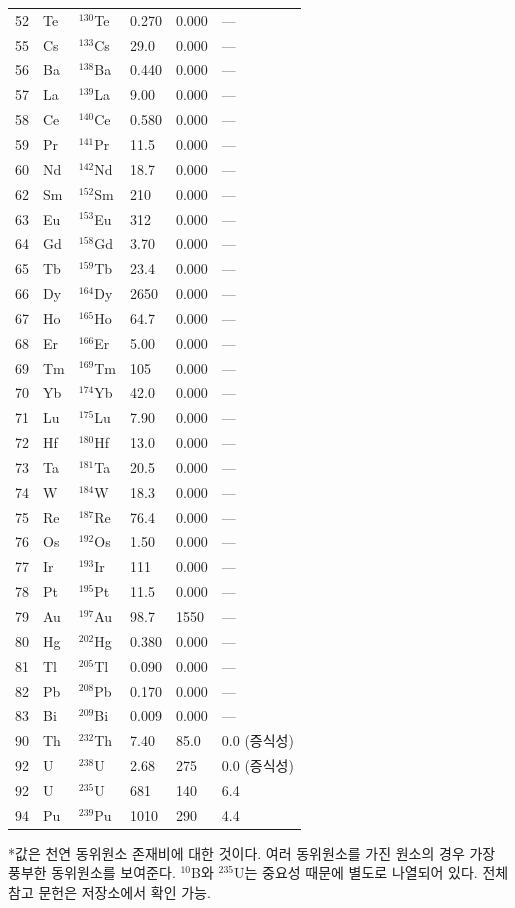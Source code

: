 \documentclass[12pt,a4paper]{article}
\begin{document}
\begin{longtable}{p{0.8cm}p{1.2cm}p{2.0cm}p{2.5cm}p{2.5cm}p{2.5cm}}
		52 & Te & \(^{130}\)Te & 0.270 & 0.000 & --- \\
		55 & Cs & \(^{133}\)Cs & 29.0 & 0.000 & --- \\
		56 & Ba & \(^{138}\)Ba & 0.440 & 0.000 & --- \\
		57 & La & \(^{139}\)La & 9.00 & 0.000 & --- \\
		58 & Ce & \(^{140}\)Ce & 0.580 & 0.000 & --- \\
		59 & Pr & \(^{141}\)Pr & 11.5 & 0.000 & --- \\
		60 & Nd & \(^{142}\)Nd & 18.7 & 0.000 & --- \\
		62 & Sm & \(^{152}\)Sm & 210 & 0.000 & --- \\
		63 & Eu & \(^{153}\)Eu & 312 & 0.000 & --- \\
		64 & Gd & \(^{158}\)Gd & 3.70 & 0.000 & --- \\
		65 & Tb & \(^{159}\)Tb & 23.4 & 0.000 & --- \\
		66 & Dy & \(^{164}\)Dy & 2650 & 0.000 & --- \\
		67 & Ho & \(^{165}\)Ho & 64.7 & 0.000 & --- \\
		68 & Er & \(^{166}\)Er & 5.00 & 0.000 & --- \\
		69 & Tm & \(^{169}\)Tm & 105 & 0.000 & --- \\
		70 & Yb & \(^{174}\)Yb & 42.0 & 0.000 & --- \\
		71 & Lu & \(^{175}\)Lu & 7.90 & 0.000 & --- \\
		72 & Hf & \(^{180}\)Hf & 13.0 & 0.000 & --- \\
		73 & Ta & \(^{181}\)Ta & 20.5 & 0.000 & --- \\
		74 & W  & \(^{184}\)W & 18.3 & 0.000 & --- \\
		75 & Re & \(^{187}\)Re & 76.4 & 0.000 & --- \\
		76 & Os & \(^{192}\)Os & 1.50 & 0.000 & --- \\
		77 & Ir & \(^{193}\)Ir & 111 & 0.000 & --- \\
		78 & Pt & \(^{195}\)Pt & 11.5 & 0.000 & --- \\
		79 & Au & \(^{197}\)Au & 98.7 & 1550 & --- \\
		80 & Hg & \(^{202}\)Hg & 0.380 & 0.000 & --- \\
		81 & Tl & \(^{205}\)Tl & 0.090 & 0.000 & --- \\
		82 & Pb & \(^{208}\)Pb & 0.170 & 0.000 & --- \\
		83 & Bi & \(^{209}\)Bi & 0.009 & 0.000 & --- \\
		90 & Th & \(^{232}\)Th & 7.40 & 85.0 & 0.0 (증식성) \\
		92 & U  & \(^{238}\)U & 2.68 & 275 & 0.0 (증식성) \\
		92 & U  & \(^{235}\)U & 681 & 140 & 6.4 \\
		94 & Pu & \(^{239}\)Pu & 1010 & 290 & 4.4 \\
		\bottomrule
	\end{longtable}
	*값은 천연 동위원소 존재비에 대한 것이다. 여러 동위원소를 가진 원소의 경우 가장 풍부한 동위원소를 보여준다. \(^{10}\)B와 \(^{235}\)U는 중요성 때문에 별도로 나열되어 있다. 전체 참고 문헌은 저장소에서 확인 가능.
	
\end{document}
